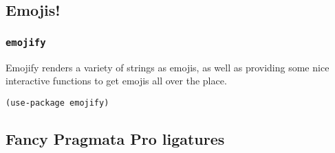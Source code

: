 \documentclass[11pt]{article}
\begin{document}
\subsection{Emojis!}
\label{sec:orgecd5899}
\subsubsection{\texttt{emojify}}
\label{sec:org8086257}
Emojify renders a variety of strings as emojis, as well as providing
some nice interactive functions to get emojis all over the place.

\begin{verbatim}
(use-package emojify)
\end{verbatim}
\subsection{Fancy Pragmata Pro ligatures}
\label{sec:orgdb3a5f6}
\end{document}
